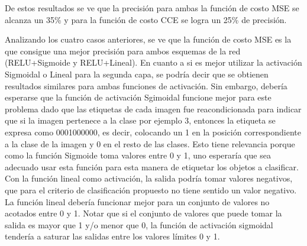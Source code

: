 De estos resultados se ve que la precisión para ambas la función de costo MSE se alcanza un 35\% y  para la función de costo CCE se logra un 25\% de precisión. 

Analizando los cuatro casos anteriores, se ve que la función de costo MSE es la que consigue una mejor precisión para ambos esquemas de la red (RELU+Sigmoide y RELU+Lineal). En cuanto a si es mejor utilizar la activación Sigmoidal o Lineal para la segunda capa, se podría decir que se obtienen resultados similares para ambas funciones de activación. Sin embargo, debería esperarse que la función de activación Sgimoidal funcione mejor para este problema dado que las etiquetas de cada imagen fue reacondicionada para indicar que si la imagen pertenece a la clase por ejemplo 3, entonces la etiqueta se expresa como 0001000000, es decir, colocando un 1 en la posición correspondiente a la clase de la imagen y 0 en el resto de las clases. Esto tiene relevancia porque como la función Sigmoide toma valores entre 0 y 1, uno esperaría que sea adecuado usar esta función para esta manera de etiquetar los objetos a clasificar. Con la función lineal como activación, la salida podría tomar valores negativos, que para el criterio de clasificación propuesto no tiene sentido un valor negativo. La función lineal debería funcionar mejor para un conjunto de valores no acotados entre 0 y 1. Notar que si el conjunto de valores que puede tomar la salida es mayor que 1 y/o menor que 0, la función de activación sigmoidal tendería a saturar las salidas entre los valores límites 0 y 1.
